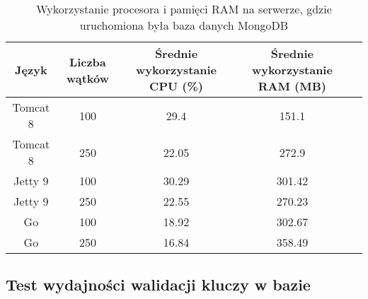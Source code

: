 \begin{table}[!htb]
\centering
\caption{Wykorzystanie procesora i pamięci RAM na serwerze, gdzie uruchomiona była baza danych MongoDB}
\label{tab:mongo-clean-api}
\begin{tabular}{@{}ccccl@{}}
\toprule
\textbf{Język} & \textbf{Liczba wątków} & \multicolumn{1}{p{3cm}}{\textbf{Średnie wykorzystanie CPU (\%)}} & \multicolumn{1}{p{3cm}}{\textbf{Średnie wykorzystanie RAM (MB)}} &  \\ \midrule
Tomcat 8       & 100                    & 29.4                             & 151.1                          &  \\
Tomcat 8       & 250                    & 22.05                             & 272.9                          &  \\
Jetty 9       & 100                    & 30.29                             & 301.42                          &  \\
Jetty 9       & 250                    & 22.55                             & 270.23                          &  \\
Go       & 100                    & 18.92                             & 302.67                          &  \\
Go       & 250                    & 16.84                             & 358.49                          &  \\
\bottomrule
\end{tabular}
\end{table}

 \newpage
 \subsection{Test wydajności walidacji kluczy w bazie}
% 
 \clearpage

